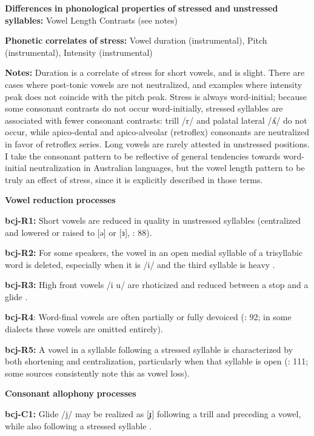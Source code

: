 \textbf{Differences} \textbf{in} \textbf{phonological} \textbf{properties} \textbf{of} \textbf{stressed} \textbf{and} \textbf{unstressed} \textbf{syllables:} Vowel Length Contrasts (see notes)

\textbf{Phonetic} \textbf{correlates} \textbf{of} \textbf{stress:} Vowel duration (instrumental), Pitch (instrumental), Intensity (instrumental)

\textbf{Notes:} Duration is a correlate of stress for short vowels, and is slight. There are cases where post-tonic vowels are not neutralized, and examples where intensity peak does not coincide with the pitch peak. Stress is always word-initial; because some consonant contrasts do not occur word-initially, stressed syllables are associated with fewer consonant contrasts: trill /r/ and palatal lateral /ʎ/ do not occur, while apico-dental and apico-alveolar (retroflex) consonants are neutralized in favor of retroflex series. Long vowels are rarely attested in unstressed positions. I take the consonant pattern to be reflective of general tendencies towards word-initial neutralization in Australian languages, but the vowel length pattern to be truly an effect of stress, since it is explicitly described in those terms.

\textbf{Vowel} \textbf{reduction} \textbf{processes}

\textbf{bcj-R1:} Short vowels are reduced in quality in unstressed syllables (centralized and lowered or raised to [ə] or [ɜ], \citealt{Bowern2012}: 88).

\textbf{bcj-R2:} For some speakers, the vowel in an open medial syllable of a trisyllabic word is deleted, especially when it is /i/ and the third syllable is heavy \citep[91]{Bowern2012}.

\textbf{bcj-R3:} High front vowels /i u/ are rhoticized and reduced between a stop and a glide \citep[91]{Bowern2012}.

\textbf{bcj-R4}: Word-final vowels are often partially or fully devoiced (\citealt{Bowern2012}: 92; in some dialects these vowels are omitted entirely).

\textbf{bcj-R5:} A vowel in a syllable following a stressed syllable is characterized by both shortening and centralization, particularly when that syllable is open (\citealt{Bowern2012}: 111; some sources consistently note this as vowel loss).

\textbf{Consonant} \textbf{allophony} \textbf{processes}

\textbf{bcj-C1:} Glide /j/ may be realized as [ɟ] following a trill and preceding a vowel, while also following a stressed syllable \citep[80-1]{Bowern2012}.

